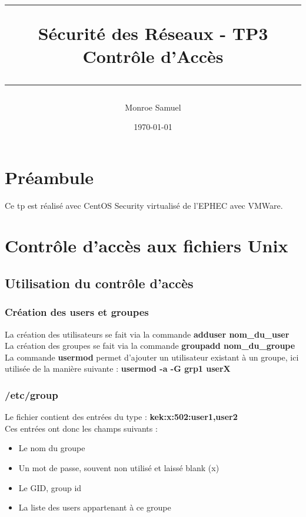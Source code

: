 \documentclass[a4paper,10pt,final,fleqn]{article}
\title{
\parbox{15cm}
{ %
  \vspace{3cm}
	\begin{center}\sf\bfseries\Huge
		\rule{15cm}{1pt}
		\medskip
		Sécurité des Réseaux - TP3 \\
		\huge Contrôle d'Accès
		\vspace{.5cm}
		\rule{15cm}{1pt}
	\end{center}
	\vspace{3cm}
 }}
\author{Monroe Samuel}
\date{\today}
\begin{document}
\maketitle
\newpage

	\section{Préambule}

		Ce tp est réalisé avec CentOS Security virtualisé de l'EPHEC avec VMWare.

	\section{Contrôle d'accès aux fichiers Unix} 

		\subsection{Utilisation du contrôle d'accès}

			\subsubsection{Création des users et groupes}

				La création des utilisateurs se fait via la commande \textbf{adduser nom\_du\_user}\\

				La création des groupes se fait via la commande \textbf{groupadd nom\_du\_groupe}\\

				La commande \textbf{usermod} permet d'ajouter un utilisateur existant à un groupe, ici utilisée de la manière suivante : \textbf{usermod -a -G grp1 userX}\\
			
			\subsubsection{/etc/group}

				Le fichier contient des entrées du type : \textbf{kek:x:502:user1,user2}\\

				Ces entrées ont donc les champs suivants : \\

				\begin{itemize}
					\item Le nom du groupe
					\item Un mot de passe, souvent non utilisé et laissé blank (x)
					\item Le GID, group id
					\item La liste des users appartenant à ce groupe
				\end{itemize}
\end{document}
